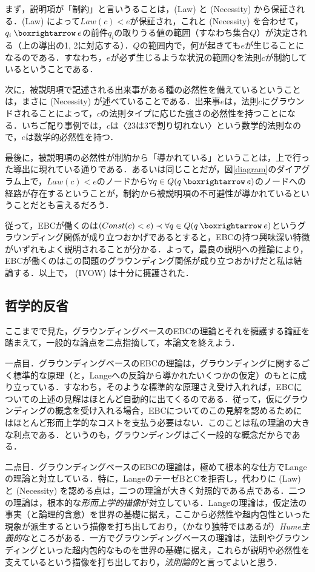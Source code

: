 \documentclass[dvipdfmx,twoside,11pt,uplatex]{jsarticle}
\theoremstyle{definition}
\begin{document}
まず，説明項が「制約」と言いうることは，(Law) と (Necessity) から保証される．(Law) によって$Law(c) < e$が保証され，これと (Necessity) を合わせて，$q_i\necif e$の前件$q_i$の取りうる値の範囲（すなわち集合$Q$）が決定される（上の導出の1, 2に対応する）．$Q$の範囲内で，何が起きても$e$が生じることになるのである．すなわち，$e$が必ず生じるような状況の範囲$Q$を法則$c$が制約しているということである．

次に，被説明項で記述される出来事がある種の必然性を備えているということは，まさに (Necessity) が述べていることである．出来事$e$は，法則$c$にグラウンドされることによって，$c$の法則タイプに応じた強さの必然性を持つことになる．いちご配り事例では，$c$は〈23は3で割り切れない〉という数学的法則なので，$e$は数学的必然性を持つ．

最後に，被説明項の必然性が制約から「導かれている」ということは，上で行った導出に現れている通りである．あるいは同じことだが，図\ref{diagram}のダイアグラム上で，$Law(c)<e$のノードから$\forall q\in Q(q\necif e)$のノードへの経路が存在するということが，制約から被説明項の不可避性が導かれているということだとも言えるだろう．

従って，EBCが働くのは$(Const(c) < e) \prec \forall q\in Q ( q \necif e )$というグラウンディング関係が成り立つおかげであるとすると，EBCの持つ興味深い特徴がいずれもよく説明されることが分かる．よって，最良の説明への推論により，EBCが働くのはこの問題のグラウンディング関係が成り立つおかげだと私は結論する．以上で， (IVOW) は十分に擁護された．

\subsection{哲学的反省}
ここまでで見た，グラウンディングベースのEBCの理論とそれを擁護する論証を踏まえて，一般的な論点を二点指摘して，本論文を終えよう．

一点目．グラウンディングベースのEBCの理論は，グラウンディングに関するごく標準的な原理（と，Langeへの反論から導かれたいくつかの仮定）のもとに成り立っている．すなわち，そのような標準的な原理さえ受け入れれば，EBCについての上述の見解はほとんど自動的に出てくるのである．従って，仮にグラウンディングの概念を受け入れる場合，EBCについてのこの見解を認めるためにはほとんど形而上学的なコストを支払う必要はない．このことは私の理論の大きな利点である．というのも，グラウンディングはごく一般的な概念だからである．

二点目．グラウンディングベースのEBCの理論は，極めて根本的な仕方でLangeの理論と対立している．特に，LangeのテーゼBとCを拒否し，代わりに (Law) と (Necessity) を認める点は，二つの理論が大きく対照的である点である．二つの理論は，根本的な\emph{形而上学的描像}が対立している．Langeの理論は，仮定法の事実（と論理的含意）を世界の基礎に据え，ここから必然性や超内包性といった現象が派生するという描像を打ち出しており，（かなり独特ではあるが）\emph{Hume主義的}なところがある．一方でグラウンディングベースの理論は，法則やグラウンディングといった超内包的なものを世界の基礎に据え，これらが説明や必然性を支えているという描像を打ち出しており，\emph{法則論的}と言ってよいと思う．
\end{document}

